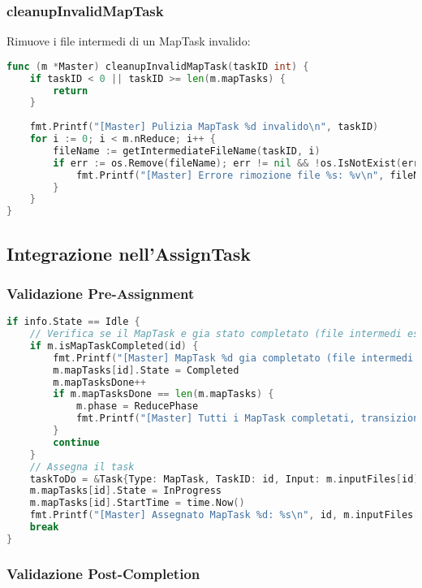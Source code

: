 \documentclass[12pt,a4paper]{article}
\begin{document}
\subsubsection{cleanupInvalidMapTask}

Rimuove i file intermedi di un MapTask invalido:

\begin{lstlisting}[language=go]
func (m *Master) cleanupInvalidMapTask(taskID int) {
    if taskID < 0 || taskID >= len(m.mapTasks) {
        return
    }
    
    fmt.Printf("[Master] Pulizia MapTask %d invalido\n", taskID)
    for i := 0; i < m.nReduce; i++ {
        fileName := getIntermediateFileName(taskID, i)
        if err := os.Remove(fileName); err != nil && !os.IsNotExist(err) {
            fmt.Printf("[Master] Errore rimozione file %s: %v\n", fileName, err)
        }
    }
}
\end{lstlisting}

\subsection{Integrazione nell'AssignTask}

\subsubsection{Validazione Pre-Assignment}

\begin{lstlisting}[language=go]
if info.State == Idle {
    // Verifica se il MapTask e gia stato completato (file intermedi esistenti)
    if m.isMapTaskCompleted(id) {
        fmt.Printf("[Master] MapTask %d gia completato (file intermedi esistenti), marco come Completed\n", id)
        m.mapTasks[id].State = Completed
        m.mapTasksDone++
        if m.mapTasksDone == len(m.mapTasks) {
            m.phase = ReducePhase
            fmt.Printf("[Master] Tutti i MapTask completati, transizione a ReducePhase\n")
        }
        continue
    }
    // Assegna il task
    taskToDo = &Task{Type: MapTask, TaskID: id, Input: m.inputFiles[id], NReduce: m.nReduce}
    m.mapTasks[id].State = InProgress
    m.mapTasks[id].StartTime = time.Now()
    fmt.Printf("[Master] Assegnato MapTask %d: %s\n", id, m.inputFiles[id])
    break
}
\end{lstlisting}

\subsubsection{Validazione Post-Completion}
\end{document}
